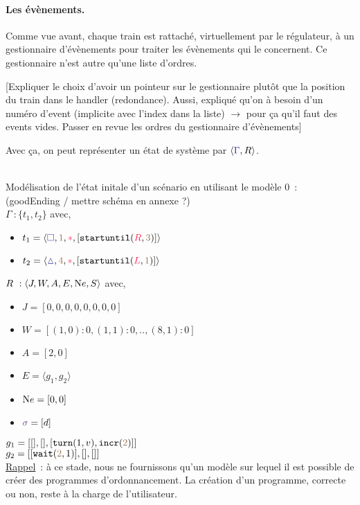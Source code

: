 \documentclass[oneside, a4paper, 11pt]{book}
\newcommand{\trainFmt}[1]{{\color{traincolor} #1}}
\newcommand{\trainTuple}[4]{\langle \trainFmt{#1}, \posFmt{#2}, \dirFmt{#3}, #4 \rangle}
\newcommand{\dirFmt}[1]{{\color{dircolor} #1}}
\newcommand{\posFmt}[1]{{\color{poscolor}{#1}}}
\newcommand{\su}[2]{{\mbox{$\mathtt{startuntil}(\dirFmt{#1}, \posFmt{#2})$}}}
\newcommand{\incr}[1]{{\mbox{\ensuremath{\mathtt{incr}(\posFmt{#1})}}}}
\newcommand{\turnOrder}[2]{{\mbox{\ensuremath{\mathtt{turn}(#1, #2)}}}}
\newcommand{\wait}[2]{{\mbox{\ensuremath{\mathtt{wait}(\posFmt{#1}, #2)}}}}
\newcommand{\swFmt}[1]{{\color{swcolor}{#1}}}
\begin{document}
\paragraph{Les évènements.}
Comme vue avant, chaque train est rattaché, virtuellement par le régulateur, à un gestionnaire d'évènements pour traiter les évènements qui le concernent.
Ce gestionnaire n'est autre qu'une liste d'ordres.

[Expliquer le choix d'avoir un pointeur sur le gestionnaire plutôt que la position du train dans le handler (redondance).
Aussi, expliqué qu'on à besoin d'un numéro d'event (implicite avec l'index dans la liste) $\rightarrow$ pour ça qu'il faut des events vides.
Passer en revue les ordres du gestionnaire d'évènements]

Avec ça, on peut représenter un état de système par $\langle \trainFmt{\Gamma}, R \rangle$.

\begin{example}[GoodEnding M0]
	~\\
	Modélisation de l'état initale d'un scénario en utilisant le modèle 0~: (goodEnding / mettre schéma en annexe ?)
	\\$\Gamma~: \{t_1, t_2\}$ avec,
	\begin{itemize}
		\item[] $t_1 = \trainTuple{\square}{1}{*}{[\su{R}{3}]}$
		\item[] $t_2 = \trainTuple{\vartriangle}{4}{*}{[\su{L}{1}]}$
	\end{itemize}
	\vspace{0.3cm}
	$R~: \langle J,W,A,E,{\text Ne},S \rangle$ avec,	
	\begin{itemize}
		\item[] $J = [0,0,0,0,0,0,0,0]$
		\item[] $W = [(1,0) : 0, (1,1) : 0, .., (8,1) : 0]$
		\item[] $A = [2,0]$
		\item[] $E = \langle g_1, g_2 \rangle$
		\item[] ${\text Ne} = [0, 0]$
		\item[] $\swFmt{\sigma} = [d]$
	\end{itemize}
	\vspace{0.3cm}
	$g_1 = [[],[],[\turnOrder{1}{v}, \incr{2}]]$
	\\$g_2 = [[\wait{2}{1}],[],[]]$
	\vspace{0.5cm}\\
	\underline{Rappel}~: à ce stade, nous ne fournissons qu'un modèle sur lequel il est possible de créer des programmes d'ordonnancement. La création d'un programme, correcte ou non, reste à la charge de l'utilisateur.
\end{example}
\end{document}
